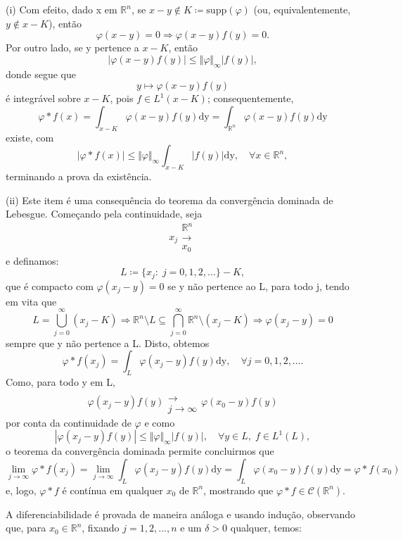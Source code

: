 \documentclass[../distribution_theory_notes.tex]{subfiles}
\begin{document}
\begin{proof*}
	(i) Com efeito, dado x em \(\mathbb{R}^{n}\), se \(x-y\not\in K\coloneqq \mathrm{supp}(\varphi )\) (ou, equivalentemente, \(y\not\in x-K\)), então
	\[
		\varphi (x-y)=0 \Rightarrow \varphi (x-y)f(y)=0.
	\]
	Por outro lado, se y pertence a \(x-K\), então
	\[
		|\varphi(x-y) f(y) | \leq \Vert \varphi  \Vert_{\infty} |f(y)|,
	\]
	donde segue que
	\[
		y\mapsto \varphi (x-y)f(y)
	\]
	é integrável sobre \(x-K\), pois \(f\in L^{1}(x-K)\); consequentemente,
	\[
		\varphi *f(x)=\int_{x-K}^{}\varphi (x-y)f(y) \mathrm{dy}=\int_{\mathbb{R}^{n}}^{}\varphi (x-y)f(y) \mathrm{dy}
	\]
	existe, com
	\[
		|\varphi *f(x)|\leq \Vert \varphi  \Vert_{\infty} \int_{x-K}^{}|f(y)| \mathrm{dy},\quad \forall x\in \mathbb{R}^{n},
	\]
	terminando a prova da existência.

	(ii) Este item é uma consequência do teorema da convergência dominada de Lebesgue. Começando pela continuidade, seja
	\[
		x_{j}\substack{\mathbb{R}^{n} \\ \longrightarrow \\ x_{0}}
	\]
	e definamos:
	\[
		L\coloneqq \{x_{j}:\; j=0,1,2,\dotsc \}-K,
	\]
	que é compacto com \(\varphi (x_{j}-y)=0\) se y não pertence ao L, para todo j, tendo em vita que
	\[
		L=\bigcup_{j=0}^{\infty}(x_{j}-K)\Rightarrow \mathbb{R}^{n}\setminus{L}\subseteq \bigcap_{j=0}^{\infty}\mathbb{R}^{n}\setminus{(x_{j}-K)}\Rightarrow \varphi (x_{j}-y)=0
	\]
	sempre que y não pertence a L. Disto, obtemos
	\[
		\varphi *f(x_{j})=\int_{L}^{}\varphi (x_{j}-y)f(y) \mathrm{dy},\quad \forall j=0,1,2,\dotsc .
	\]
	Como, para todo y em L,
	\[
		\varphi (x_{j}-y)f(y)\substack{ \\ \longrightarrow \\ j\to\infty}\varphi (x_{0}-y)f(y)
	\]
	por conta da continuidade de \(\varphi \) e como
	\[
		|\varphi (x_{j}-y)f(y)|\leq \Vert \varphi  \Vert_{\infty}|f(y)|,\quad \forall y\in L,\; f\in L^{1}(L),
	\]
	o teorema da convergência dominada permite concluirmos que
	\[
		\lim_{j\to \infty}\varphi *f(x_{j})=\lim_{j\to \infty}\int_{L}^{}\varphi (x_{j}-y)f(y) \mathrm{dy}=\int_{L}^{}\varphi (x_{0}-y)f(y) \mathrm{dy}=\varphi *f(x_{0})
	\]
	e, logo, \(\varphi *f\) é contínua em qualquer \(x_{0}\) de \(\mathbb{R}^{n}\), mostrando que \(\varphi *f\in \mathcal{C}(\mathbb{R}^{n})\).

	A diferenciabilidade é provada de maneira análoga e usando indução, observando que, para \(x_{0}\in \mathbb{R}^{n}\), fixando \(j=1,2,\dotsc ,n\) e um \(\delta >0\) qualquer, temos:


\end{proof*}
\end{document}

